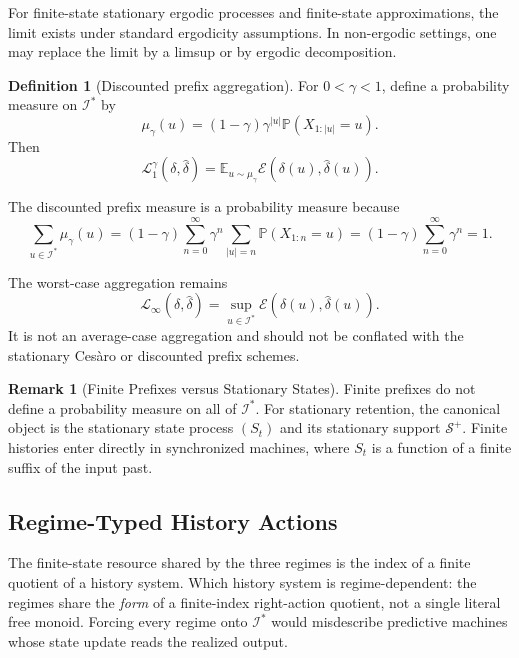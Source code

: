 \documentclass[12pt]{article}
\theoremstyle{definition}
\newtheorem{definition}[theorem]{Definition}
\newtheorem{remark}[theorem]{Remark}
\newcommand{\Splus}{\mathcal S^{+}}
\begin{document}
For finite-state stationary ergodic processes and finite-state
approximations, the limit exists under standard ergodicity assumptions.  In
non-ergodic settings, one may replace the limit by a limsup or by ergodic
decomposition.

\begin{definition}[Discounted prefix aggregation]
\label{def:discounted-agg}
For $0<\gamma<1$, define a probability measure on $\mathcal I^*$ by
\[
\mu_\gamma(u)
=
(1-\gamma)\gamma^{|u|}
\mathbb P(X_{1:|u|}=u).
\]
Then
\[
\mathcal L_1^\gamma(\delta,\widehat\delta)
=
\mathbb E_{u\sim\mu_\gamma}
\mathcal E(\delta(u),\widehat\delta(u)).
\]
\end{definition}

The discounted prefix measure is a probability measure because
\[
\sum_{u\in\mathcal I^*}\mu_\gamma(u)
=
(1-\gamma)
\sum_{n=0}^\infty
\gamma^n
\sum_{|u|=n}
\mathbb P(X_{1:n}=u)
=
(1-\gamma)
\sum_{n=0}^\infty
\gamma^n
=
1.
\]

The worst-case aggregation remains
\[
\mathcal L_\infty(\delta,\widehat\delta)
=
\sup_{u\in\mathcal I^*}
\mathcal E(\delta(u),\widehat\delta(u)).
\]
It is not an average-case aggregation and should not be conflated with the
stationary Ces\`aro or discounted prefix schemes.

\begin{remark}[Finite Prefixes versus Stationary States]
\label{rem:prefixes-versus-states}
Finite prefixes do not define a probability measure on all of
$\mathcal I^*$.  For stationary retention, the canonical object is the
stationary state process $(S_t)$ and its stationary support $\Splus$.  Finite
histories enter directly in synchronized machines, where $S_t$ is a function
of a finite suffix of the input past.
\end{remark}

\subsection{Regime-Typed History Actions}
\label{subsec:history-actions}

The finite-state resource shared by the three regimes is the index of a finite
quotient of a history system.  Which history system is regime-dependent: the
regimes share the \emph{form} of a finite-index right-action quotient, not a
single literal free monoid.  Forcing every regime onto $\mathcal I^*$ would
misdescribe predictive machines whose state update reads the realized output.
\end{document}
